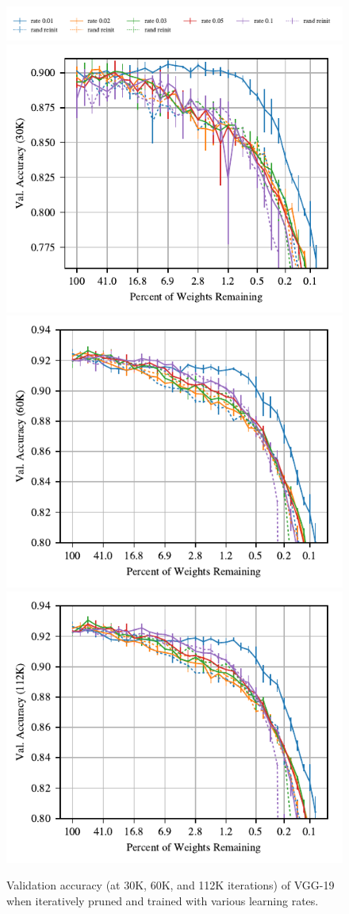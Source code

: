 \begin{figure}
\centering
\vspace{-.5em}
\includegraphics[width=.7\textwidth]{graphs/cifar10/icml/vgg19-iclr-sweep-30000/legend}
\includegraphics[width=.33\textwidth]{graphs/cifar10/icml/vgg19-iclr-sweep-30000/accuracy}%
\includegraphics[width=.33\textwidth]{graphs/cifar10/icml/vgg19-iclr-sweep-60000/accuracy}%
\includegraphics[width=.33\textwidth]{graphs/cifar10/icml/vgg19-iclr-sweep-112000/accuracy}%
\vspace{-1em}
\caption{Validation accuracy (at 30K, 60K, and 112K iterations) of VGG-19 when iteratively pruned and trained with various learning rates.}
\label{fig:vgg19-rate}
\end{figure}

